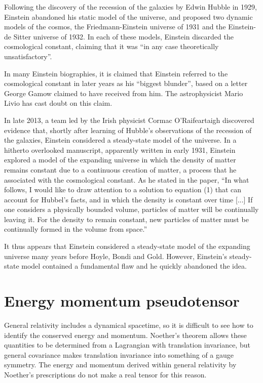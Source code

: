\documentclass[twoside]{memoir}
\begin{document}
Following the discovery of the recession of the galaxies by Edwin Hubble in 1929, Einstein abandoned his static model of the universe, and proposed two dynamic models of the cosmos, the Friedmann-Einstein universe of 1931 and the Einstein-de Sitter universe of 1932.\cite{J9Tqu} In each of these models, Einstein discarded the cosmological constant, claiming that it was \enquote{in any case theoretically unsatisfactory}.\cite{sxfvo}

In many Einstein biographies, it is claimed that Einstein referred to the cosmological constant  in later years as his \enquote{biggest blunder}, based on a letter George Gamow claimed to have received from him. The astrophysicist Mario Livio has cast doubt on this claim.\cite{qmmVf}

In late 2013, a team led by the Irish physicist Cormac O'Raifeartaigh  discovered evidence that, shortly after learning of Hubble's observations of the recession of the galaxies, Einstein considered a steady-state model of the universe.\cite{Tq53z,8pfEk} In a hitherto overlooked manuscript, apparently written in early 1931, Einstein explored a model of the expanding universe in which the density of matter remains constant due to a continuous creation of matter, a process that he associated with the cosmological constant. As he stated in the paper, \enquote{In what follows, I would like to draw attention to a solution to equation (1) that can account for Hubbel's facts, and in which the density is constant over time [...] If one considers a physically bounded volume, particles of matter will be continually leaving it. For the density to remain constant, new particles of matter must be continually formed in the volume from space.}

It thus appears that Einstein considered a steady-state model of the expanding universe many years before Hoyle, Bondi and Gold.\cite{ILjYQ}\cite{ThZb0} However, Einstein's steady-state model contained a fundamental flaw and he quickly abandoned the idea.\cite{7ShC9}

\section{Energy momentum pseudotensor}\label{energy-momentum-pseudotensor}

General relativity includes a dynamical spacetime, so it is difficult to see how to identify the conserved energy and momentum. Noether's theorem allows these quantities to be determined from a Lagrangian with translation invariance, but general covariance makes translation invariance into something of a gauge symmetry. The energy and momentum derived within general relativity by Noether's prescriptions do not make a real tensor for this reason.
\end{document}
